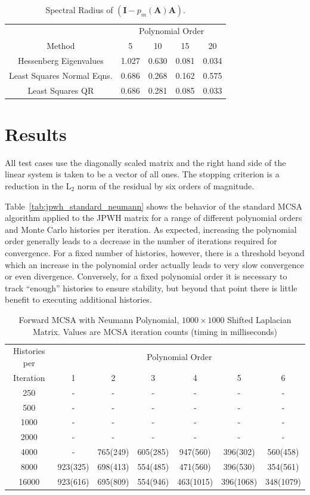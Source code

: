 \documentclass[10pt]{article}
\newcommand{\bA}{\ensuremath{\mathbf{A}}}
\newcommand{\bI}{\ensuremath{\mathbf{I}}}
\begin{document}
\begin{table}
\centering
\caption{Spectral Radius of $\left( \bI - p_m(\bA) \bA \right)$.}
\label{tab:gmres_poly}
\begin{tabular}{ccccc}
\toprule
& \multicolumn{4}{c}{Polynomial Order} \\
\cmidrule(r){2-5}
Method & 5 & 10 & 15 & 20 \\
\midrule
Hessenberg Eigenvalues     & 1.027 & 0.630 & 0.081 & 0.034 \\
Least Squares Normal Eqns. & 0.686 & 0.268 & 0.162 & 0.575 \\
Least Squares QR           & 0.686 & 0.281 & 0.085 & 0.033 \\
\bottomrule
\end{tabular}
\end{table}

\section{Results}
\label{sec:results}

All test cases use the diagonally scaled matrix and the right
hand side of the linear system is taken to be a vector of all ones.
The stopping criterion is a reduction in the L$_2$ norm of the residual
by six orders of magnitude.

Table~\ref{tab:jpwh_standard_neumann} shows the behavior of
the standard MCSA algorithm applied to the JPWH matrix for a range
of different polynomial orders and Monte Carlo histories per iteration.
As expected, increasing the polynomial order generally leads to a decrease
in the number of iterations required for convergence.
For a fixed number of histories, however, there is a threshold beyond
which an increase in the polynomial order actually leads to very slow
convergence or even divergence.  Conversely, for a fixed polynomial order
it is necessary to track ``enough'' histories to ensure stability, but
beyond that point there is little benefit to executing additional histories.
\begin{table}
\caption{Forward MCSA with Neumann Polynomial, $1000 \times 1000$ Shifted Laplacian Matrix.
Values are MCSA iteration counts (timing in milliseconds)
\label{tab:lap_forward_neumann}}
\centering
\begin{tabular}{ccccccc}
\toprule
Histories per & \multicolumn{6}{c}{Polynomial Order} \\
Iteration & 1 & 2 & 3 & 4 & 5 & 6 \\
\midrule
250 & - & - & - & - & - & - \\
500 & - & - & - & - & - & - \\
1000 & - & - & - & - & - & - \\
2000 & - & - & - & - & - & - \\
4000 & - & 765(249) & 605(285) & 947(560) & 396(302) & 560(458) \\
8000 & 923(325) & 698(413) & 554(485) & 471(560) & 396(530) & 354(561) \\
16000 & 923(616) & 695(809) & 554(946) & 463(1015) & 396(1068) & 348(1079) \\
\bottomrule
\end{tabular}
\end{table}
\end{document}
